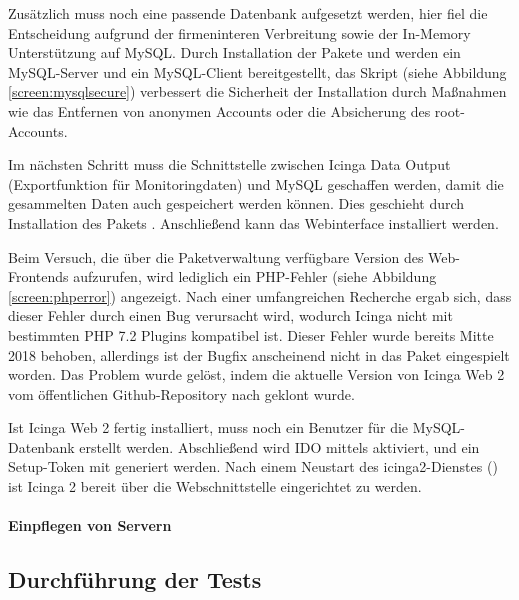 Zusätzlich muss noch eine passende Datenbank aufgesetzt werden, hier fiel die Entscheidung aufgrund der firmeninteren Verbreitung sowie der In-Memory Unterstützung auf MySQL. Durch Installation der Pakete  und  werden ein MySQL-Server und ein MySQL-Client bereitgestellt, das Skript  (siehe Abbildung \ref{screen:mysqlsecure}) verbessert die Sicherheit der Installation durch Maßnahmen wie das Entfernen von anonymen Accounts oder die Absicherung des root-Accounts.

Im nächsten Schritt muss die Schnittstelle zwischen \glqq{}Icinga Data Output\grqq{} (Exportfunktion für Monitoringdaten) und MySQL geschaffen werden, damit die gesammelten Daten auch gespeichert werden können. Dies geschieht durch Installation des Pakets . Anschließend kann das Webinterface  installiert werden.

Beim Versuch, die über die Paketverwaltung verfügbare Version des Web-Frontends aufzurufen, wird lediglich ein PHP-Fehler (siehe Abbildung \ref{screen:phperror}) angezeigt. Nach einer umfangreichen Recherche ergab sich, dass dieser Fehler durch einen Bug verursacht wird, wodurch \glqq{}Icinga\grqq{} nicht mit bestimmten PHP 7.2 Plugins kompatibel ist. Dieser Fehler wurde bereits Mitte 2018 behoben, allerdings ist der Bugfix anscheinend nicht in das Paket eingespielt worden. Das Problem wurde gelöst, indem die aktuelle Version von \glqq{}Icinga Web 2\grqq{} vom öffentlichen Github-Repository nach  geklont wurde.

Ist \glqq{}Icinga Web 2\grqq{} fertig installiert, muss noch ein Benutzer für die MySQL-Datenbank erstellt werden. Abschließend wird IDO mittels  aktiviert, und ein Setup-Token mit  generiert werden. Nach einem Neustart des icinga2-Dienstes () ist \glqq{}Icinga 2\grqq{} bereit über die Webschnittstelle eingerichtet zu werden.


\paragraph{Einpflegen von Servern}
\label{sec:EinpflegenServer}

\subsection{Durchführung der Tests}
\label{sec:DurchführungTests}



